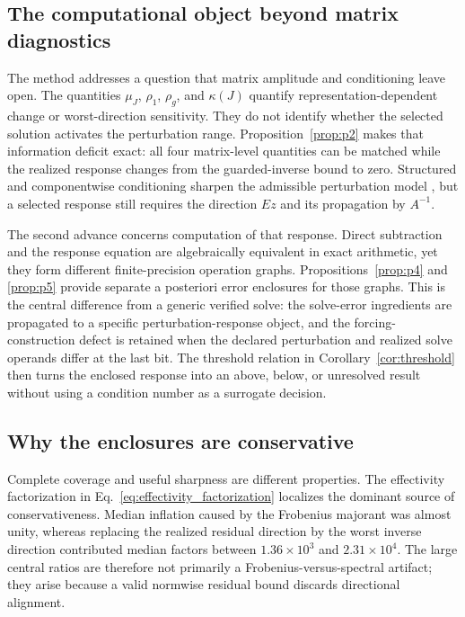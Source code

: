 \subsection{The computational object beyond matrix diagnostics}

The method addresses a question that matrix amplitude and conditioning leave
open. The quantities $\mu_J$, $\rho_1$, $\rho_g$, and $\kappa(J)$ quantify
representation-dependent change or worst-direction sensitivity. They do not
identify whether the selected solution activates the perturbation range.
Proposition~\ref{prop:p2} makes that information deficit exact: all four
matrix-level quantities can be matched while the realized response changes
from the guarded-inverse bound to zero. Structured and componentwise
conditioning sharpen the admissible perturbation model
\cite{S39,S40,S41}, but a selected response still requires the direction
$Ez$ and its propagation by $A^{-1}$.

The second advance concerns computation of that response. Direct subtraction
and the response equation are algebraically equivalent in exact arithmetic,
yet they form different finite-precision operation graphs.
Propositions~\ref{prop:p4} and \ref{prop:p5} provide separate a posteriori
error enclosures for those graphs. This is the central difference from a
generic verified solve: the solve-error ingredients are propagated to a
specific perturbation-response object, and the forcing-construction defect is
retained when the declared perturbation and realized solve operands differ at
the last bit. The threshold relation in Corollary~\ref{cor:threshold} then
turns the enclosed response into an above, below, or unresolved result without
using a condition number as a surrogate decision.

\subsection{Why the enclosures are conservative}

Complete coverage and useful sharpness are different properties. The
effectivity factorization in Eq.~\eqref{eq:effectivity_factorization}
localizes the dominant source of conservativeness. Median inflation caused by
the Frobenius majorant was almost unity, whereas replacing the realized
residual direction by the worst inverse direction contributed median factors
between $1.36\times10^3$ and $2.31\times10^4$. The large central ratios are
therefore not primarily a Frobenius-versus-spectral artifact; they arise
because a valid normwise residual bound discards directional alignment.

